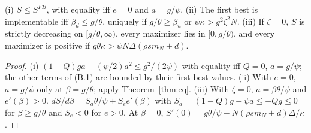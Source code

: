 \documentclass[acmsmall,screen,review,anonymous]{acmart}
\theoremstyle{acmdefinition}
\begin{document}
\begin{theorem}\label{thm:pay}
(i) $S \le S^{FB}$, with equality iff $e = 0$ and $a = g/\psi$. (ii) The first best is implementable iff $\beta_d \le g/\theta$, uniquely if $g/\theta \ge \beta_u$ or $\psi\kappa > g^2\zeta^2N$. (iii) If $\zeta = 0$, $S$ is strictly decreasing on $[g/\theta,\infty)$, every maximizer lies in $[0, g/\theta)$, and every maximizer is positive if $g\theta\kappa > \psi N\Delta(\rho s m_N + d)$.
\end{theorem}
\begin{proof}
(i) $(1-Q)ga - (\psi/2)a^2 \le g^2/(2\psi)$ with equality iff $Q = 0$, $a = g/\psi$; the other terms of (B.1) are bounded by their first-best values. (ii) With $e = 0$, $a = g/\psi$ only at $\beta = g/\theta$; apply Theorem~\ref{thm:eq}. (iii) With $\zeta = 0$, $a = \beta\theta/\psi$ and $e'(\beta) > 0$. $dS/d\beta = S_a\theta/\psi + S_e e'(\beta)$ with $S_a = (1-Q)g - \psi a \le -Qg \le 0$ for $\beta \ge g/\theta$ and $S_e < 0$ for $e > 0$. At $\beta = 0$, $S'(0) = g\theta/\psi - N(\rho s m_N + d)\Delta/\kappa$.
\end{proof}
\end{document}

